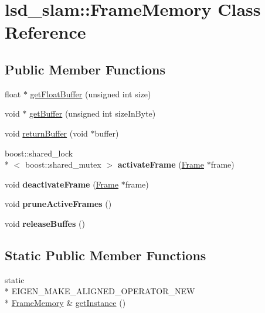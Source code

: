 \hypertarget{classlsd__slam_1_1_frame_memory}{\section{lsd\-\_\-slam\-:\-:Frame\-Memory Class Reference}
\label{classlsd__slam_1_1_frame_memory}
}
\subsection*{Public Member Functions}
\begin{DoxyCompactItemize}
\item 
float $\ast$ \hyperlink{classlsd__slam_1_1_frame_memory_a5a2a621821958fe136a2ddc9707a1f72}{get\-Float\-Buffer} (unsigned int size)
\item 
void $\ast$ \hyperlink{classlsd__slam_1_1_frame_memory_abd3eb8d2623e977f3da91416d66d01e3}{get\-Buffer} (unsigned int size\-In\-Byte)
\item 
void \hyperlink{classlsd__slam_1_1_frame_memory_a04c59c5c8cfd2b65b4d7ce7b7d6ba493}{return\-Buffer} (void $\ast$buffer)
\item 
\hypertarget{classlsd__slam_1_1_frame_memory_a6835f2a14358dee3518d9f9bff8526e3}{boost\-::shared\-\_\-lock\\*
$<$ boost\-::shared\-\_\-mutex $>$ {\bfseries activate\-Frame} (\hyperlink{classlsd__slam_1_1_frame}{Frame} $\ast$frame)}\label{classlsd__slam_1_1_frame_memory_a6835f2a14358dee3518d9f9bff8526e3}

\item 
\hypertarget{classlsd__slam_1_1_frame_memory_aa44bf3b85a471ccb4c4c7da53f395ec6}{void {\bfseries deactivate\-Frame} (\hyperlink{classlsd__slam_1_1_frame}{Frame} $\ast$frame)}\label{classlsd__slam_1_1_frame_memory_aa44bf3b85a471ccb4c4c7da53f395ec6}

\item 
\hypertarget{classlsd__slam_1_1_frame_memory_a39ebe0415eda3609bf80481b02fe7efc}{void {\bfseries prune\-Active\-Frames} ()}\label{classlsd__slam_1_1_frame_memory_a39ebe0415eda3609bf80481b02fe7efc}

\item 
\hypertarget{classlsd__slam_1_1_frame_memory_aec600d5495fb555f10b6d3383513d0c6}{void {\bfseries release\-Buffes} ()}\label{classlsd__slam_1_1_frame_memory_aec600d5495fb555f10b6d3383513d0c6}

\end{DoxyCompactItemize}
\subsection*{Static Public Member Functions}
\begin{DoxyCompactItemize}
\item 
static \\*
E\-I\-G\-E\-N\-\_\-\-M\-A\-K\-E\-\_\-\-A\-L\-I\-G\-N\-E\-D\-\_\-\-O\-P\-E\-R\-A\-T\-O\-R\-\_\-\-N\-E\-W \\*
\hyperlink{classlsd__slam_1_1_frame_memory}{Frame\-Memory} \& \hyperlink{classlsd__slam_1_1_frame_memory_adf4afed8c58a420b38e4b117628ac32d}{get\-Instance} ()
\end{DoxyCompactItemize}


